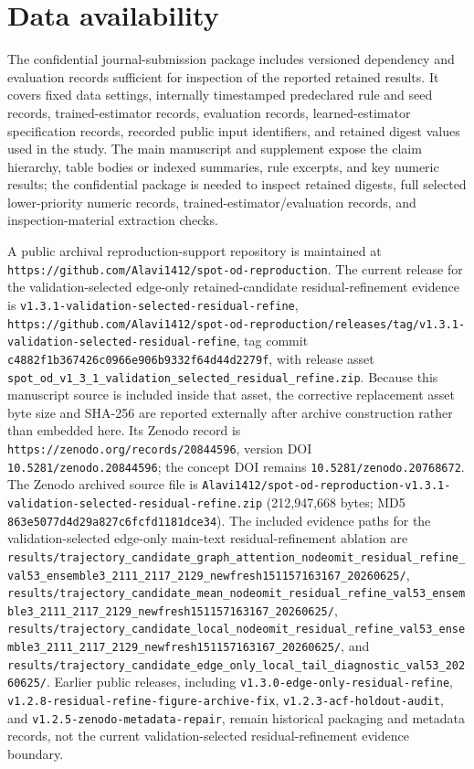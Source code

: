 \documentclass{article}
\begin{document}
\section*{Data availability}
The confidential journal-submission package includes versioned dependency and evaluation records sufficient for inspection of the reported retained results. It covers fixed data settings, internally timestamped predeclared rule and seed records, trained-estimator records, evaluation records, learned-estimator specification records, recorded public input identifiers, and retained digest values used in the study. The main manuscript and supplement expose the claim hierarchy, table bodies or indexed summaries, rule excerpts, and key numeric results; the confidential package is needed to inspect retained digests, full selected lower-priority numeric records, trained-estimator/evaluation records, and inspection-material extraction checks.

A public archival reproduction-support repository is maintained at \nolinkurl{https://github.com/Alavi1412/spot-od-reproduction}. The current release for the validation-selected edge-only retained-candidate residual-refinement evidence is \texttt{v1.3.1-validation-selected-residual-refine}, \nolinkurl{https://github.com/Alavi1412/spot-od-reproduction/releases/tag/v1.3.1-validation-selected-residual-refine}, tag commit \nolinkurl{c4882f1b367426c0966e906b9332f64d44d2279f}, with release asset \nolinkurl{spot_od_v1_3_1_validation_selected_residual_refine.zip}. Because this manuscript source is included inside that asset, the corrective replacement asset byte size and SHA-256 are reported externally after archive construction rather than embedded here. Its Zenodo record is \nolinkurl{https://zenodo.org/records/20844596}, version DOI \nolinkurl{10.5281/zenodo.20844596}; the concept DOI remains \nolinkurl{10.5281/zenodo.20768672}. The Zenodo archived source file is \nolinkurl{Alavi1412/spot-od-reproduction-v1.3.1-validation-selected-residual-refine.zip} (212,947,668 bytes; MD5 \nolinkurl{863e5077d4d29a827c6fcfd1181dce34}). The included evidence paths for the validation-selected edge-only main-text residual-refinement ablation are \nolinkurl{results/trajectory_candidate_graph_attention_nodeomit_residual_refine_val53_ensemble3_2111_2117_2129_newfresh151157163167_20260625/}, \nolinkurl{results/trajectory_candidate_mean_nodeomit_residual_refine_val53_ensemble3_2111_2117_2129_newfresh151157163167_20260625/}, \nolinkurl{results/trajectory_candidate_local_nodeomit_residual_refine_val53_ensemble3_2111_2117_2129_newfresh151157163167_20260625/}, and \nolinkurl{results/trajectory_candidate_edge_only_local_tail_diagnostic_val53_20260625/}. Earlier public releases, including \texttt{v1.3.0-edge-only-residual-refine}, \texttt{v1.2.8-residual-refine-figure-archive-fix}, \texttt{v1.2.3-acf-holdout-audit}, and \texttt{v1.2.5-zenodo-metadata-repair}, remain historical packaging and metadata records, not the current validation-selected residual-refinement evidence boundary.
\end{document}
